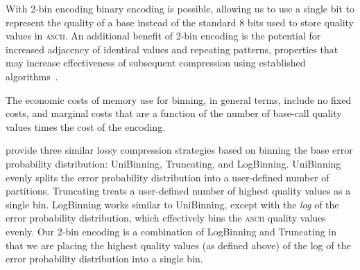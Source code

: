 With 2-bin encoding binary encoding is possible, allowing us to use a
single bit to represent the quality of a base instead of the standard
8 bits used to store quality values in \textsc{ascii}. An additional
benefit of 2-bin encoding is the potential for increased adjacency of
identical values and repeating patterns, properties that may increase
effectiveness of subsequent compression using established
algorithms~\cite[e.g.,][]{HUFFMAN:1952nr,Ziv77auniversal,
  DBLP:journals/tit/ZivL78}.

The economic costs of memory use for binning, in general terms,
include no fixed costs, and marginal costs that are a function of the
number of base-call quality values times the cost of the encoding.

\cite{Wan:2012kq} provide three similar lossy compression strategies based on binning the base error probability distribution: UniBinning, Truncating, and LogBinning.
UniBinning evenly splits the error probability distribution into a user-defined number of partitions.
Truncating treats a user-defined number of highest quality values as a single bin.
LogBinning works similar to UniBinning, except with the \emph{log} of the error probability distribution, which effectively bins the \textsc{ascii} quality values evenly.
Our 2-bin encoding is a combination of LogBinning and Truncating in that we are placing the highest quality values (as defined above) of the log of the error probability distribution into a single bin.


